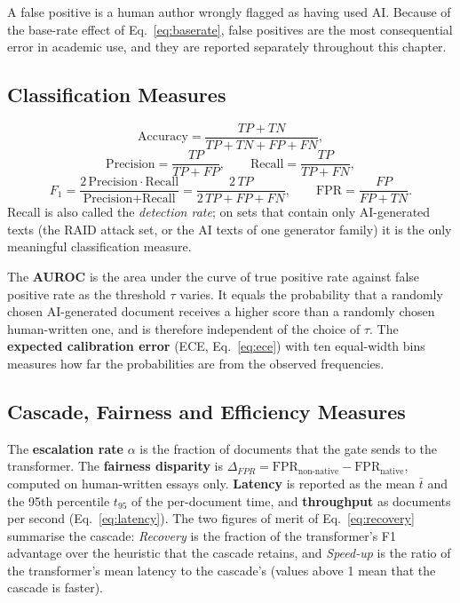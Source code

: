 A false positive is a human author wrongly flagged as having used AI. Because
of the base-rate effect of Eq.~\eqref{eq:baserate}, false positives are the
most consequential error in academic use, and they are reported separately
throughout this chapter.

\subsection{Classification Measures}

\begin{equation}
  \text{Accuracy} = \frac{TP+TN}{TP+TN+FP+FN},
  \label{eq:acc}
\end{equation}
\begin{equation}
  \text{Precision} = \frac{TP}{TP+FP},\qquad
  \text{Recall} = \frac{TP}{TP+FN},
  \label{eq:accprecrec}
\end{equation}
\begin{equation}
  F_1 = \frac{2\,\text{Precision}\cdot\text{Recall}}{\text{Precision}+\text{Recall}}
      = \frac{2\,TP}{2\,TP+FP+FN},\qquad
  \text{FPR} = \frac{FP}{FP+TN}.
  \label{eq:f1fpr}
\end{equation}
Recall is also called the \emph{detection rate}; on sets that contain only
AI-generated texts (the RAID attack set, or the AI texts of one generator
family) it is the only meaningful classification measure.

The \textbf{AUROC} is the area under the curve of true positive rate against
false positive rate as the threshold $\tau$ varies. It equals the probability
that a randomly chosen AI-generated document receives a higher score than a
randomly chosen human-written one, and is therefore independent of the choice
of $\tau$. The \textbf{expected calibration error} (ECE, Eq.~\eqref{eq:ece}) with
ten equal-width bins measures how far the probabilities are from the observed
frequencies.

\subsection{Cascade, Fairness and Efficiency Measures}

The \textbf{escalation rate} $\alpha$ is the fraction of documents that the
gate sends to the transformer. The \textbf{fairness disparity} is
$\Delta_{FPR} = \mathrm{FPR}_{\text{non-native}} - \mathrm{FPR}_{\text{native}}$,
computed on human-written essays only. \textbf{Latency} is reported as the
mean $\bar{t}$ and the 95th percentile $t_{95}$ of the per-document time, and
\textbf{throughput} as documents per second (Eq.~\eqref{eq:latency}). The two
figures of merit of Eq.~\eqref{eq:recovery} summarise the cascade:
\emph{Recovery} is the fraction of the transformer's F1 advantage over the
heuristic that the cascade retains, and \emph{Speed-up} is the ratio of the
transformer's mean latency to the cascade's (values above 1 mean that the
cascade is faster).

